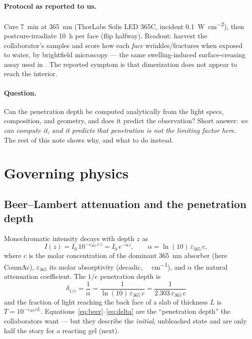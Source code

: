 \documentclass[11pt]{article}
\newcommand{\Wcm}{\si{\watt\per\square\cm}}
\newcommand{\eps}{\varepsilon_{365}}
\begin{document}
\paragraph{Protocol as reported to us.}
Cure \SI{7}{min} at \SI{365}{nm} (ThorLabs Solis LED 365C, incident \SI{0.1}{\Wcm}),
then postcure-irradiate \SI{10}{h} per face (flip halfway). Readout: harvest the
collaborator's samples and score how each \emph{face} wrinkles/fractures when exposed to
water, by brightfield microscopy --- the same swelling-induced surface-creasing assay used
in \cite{vanzanten2026}. The reported symptom is that dimerization does not appear to reach
the interior.

\paragraph{Question.}
Can the penetration depth be computed analytically from the light specs, composition, and
geometry, and does it predict the observation? Short answer: \emph{we can compute it, and it
predicts that penetration is not the limiting factor here.} The rest of this note shows why,
and what to do instead.

\section{Governing physics}

\subsection{Beer--Lambert attenuation and the penetration depth}
Monochromatic intensity decays with depth $z$ as
\begin{equation}
  I(z) = I_0\, 10^{-\eps\, c\, z} = I_0\, e^{-\alpha z},
  \qquad \alpha = \ln(10)\,\eps\, c ,
  \label{eq:beer}
\end{equation}
where $c$ is the molar concentration of the dominant \SI{365}{nm} absorber (here CoumAc),
$\eps$ its molar absorptivity (decadic, \si{\per\Molar\per\cm}), and $\alpha$ the natural
attenuation coefficient. The $1/e$ penetration depth is
\begin{equation}
  \boxed{\;\delta_{1/e} = \frac{1}{\alpha} = \frac{1}{\ln(10)\,\eps\, c}
  = \frac{1}{2.303\,\eps\, c}\;}
  \label{eq:delta}
\end{equation}
and the fraction of light reaching the back face of a slab of thickness $L$ is
$T = 10^{-\eps c L}$. Equations~\eqref{eq:beer}--\eqref{eq:delta} are the ``penetration
depth'' the collaborators want --- but they describe the \emph{initial}, unbleached state
and are only half the story for a reacting gel (next).
\end{document}
